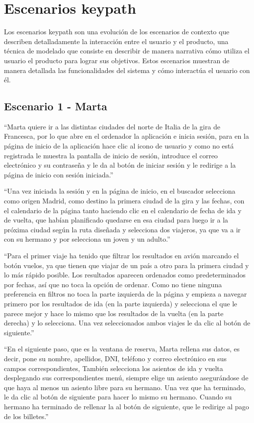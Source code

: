 \section{Escenarios keypath}

Los escenarios keypath son una evolución de los escenarios de contexto que describen detalladamente la interacción entre el usuario y el producto, una técnica de modelado que consiste en describir de manera narrativa cómo utiliza el usuario el producto para lograr sus objetivos. Estos escenarios muestran de manera detallada las funcionalidades del sistema y cómo interactúa el usuario con él.

\subsection{Escenario 1 - Marta}

``Marta quiere ir a las distintas ciudades del norte de Italia de la gira de Francesca, por lo que abre en el ordenador la aplicación e inicia sesión, para en la página de inicio de la aplicación hace clic al icono de usuario y como no está registrada le muestra la pantalla de inicio de sesión, introduce el correo electrónico y su contraseña y le da al botón de iniciar sesión y le redirige a la página de inicio con sesión iniciada.''

``Una vez iniciada la sesión y en la página de inicio, en el buscador selecciona como origen Madrid, como destino la primera ciudad de la gira y las fechas, con el calendario de la página tanto haciendo clic en el calendario de fecha de ida y de vuelta, que habían planificado quedarse en esa ciudad para luego ir a la próxima ciudad según la ruta diseñada y selecciona dos viajeros, ya que va a ir con su hermano y por selecciona un joven y un adulto.''

``Para el primer viaje ha tenido que filtrar los resultados en avión marcando el botón vuelos, ya que tienen que viajar de un país a otro para la primera ciudad y lo más rápido posible. Los resultados aparecen ordenados como predeterminados por fechas, así que no toca la opción de ordenar. Como no tiene ninguna preferencia en filtros no toca la parte izquierda de la página y empieza a navegar primero por los resultados de ida (en la parte izquierda) y selecciona el que le parece mejor y hace lo mismo que los resultados de la vuelta (en la parte derecha) y lo selecciona. Una vez seleccionados ambos viajes le da clic al botón de siguiente.''

``En el siguiente paso, que es la ventana de reserva, Marta rellena sus datos, es decir, pone su nombre, apellidos, DNI, teléfono y correo electrónico en sus campos correspondientes, También selecciona los asientos de ida y vuelta desplegando sus correspondientes menú, siempre elige un asiento asegurándose de que haya al menos un asiento libre para su hermano. Una vez que ha terminado, le da clic al botón de siguiente para hacer lo mismo su hermano. Cuando su hermano ha terminado de rellenar la al botón de siguiente, que le redirige al pago de los billetes.''

